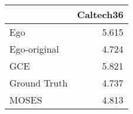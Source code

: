 \begin{tabular}{lr}
\toprule
{} & Caltech36 \\
\midrule
Ego          &     5.615 \\
Ego-original &     4.724 \\
GCE          &     5.821 \\
Ground Truth &     4.737 \\
MOSES        &     4.813 \\
\bottomrule
\end{tabular}
